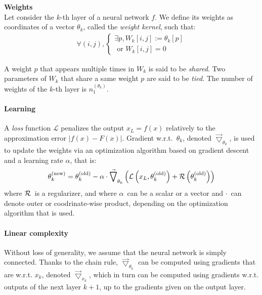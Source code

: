 \begin{definition}\textbf{Weights}\\
Let consider the $k$-th layer of a neural network $f$. We define its weights as coordinates of a vector $\theta_k$, called the \emph{weight kernel}, such that:
\begin{gather*}
  \forall (i,j),
    \begin{cases}
      \exists p, W_k[i,j] := \theta_k[p] \\
      \text{ or } W_k[i,j] = 0
    \end{cases}
\end{gather*}
\end{definition}
A weight $p$ that appears multiple times in $W_k$ is said to be \emph{shared}. Two parameters of $W_k$ that share a same weight $p$ are said to be \emph{tied}. The number of weights of the $k$-th layer is $n_1^{(\theta_k)}$.

\paragraph{Learning}
A \emph{loss} function $\mathcal{L}$ penalizes the output $x_L = f(x)$ relatively to the approximation error $|f(x) - F(x)|$. Gradient w.r.t.~$\theta_k$, denoted $\vec{\bigtriangledown}_{\theta_k}$, is used to update the weights via an optimization algorithm based on gradient descent and a learning rate $\alpha$, that is:
\begin{gather}
\theta_k^{(\text{new})} = \theta_k^{(\text{old})} - \alpha \cdot \vec{\bigtriangledown}_{\theta_k} \left( \mathcal{L}\left( x_L, \theta_k^{(\text{old})} \right) + \mathcal{R}\left( \theta_k^{(\text{old})} \right) \right)
\end{gather}
where $\mathcal{R}$~is a regularizer, and where $\alpha$~can be a scalar or a vector and $\cdot$~can denote outer or coodrinate-wise product, depending on the optimization algorithm that is used.

\paragraph{Linear complexity}
Without loss of generality, we assume that the neural network is simply connected. Thanks to the chain rule, $\vec{\bigtriangledown}_{\theta_k}$ can be computed using gradients that are w.r.t. $x_k$, denoted $\vec{\bigtriangledown}_{x_k}$, which in turn can be computed using gradients w.r.t. outputs of the next layer $k+1$, up to the gradients given on the output layer.

